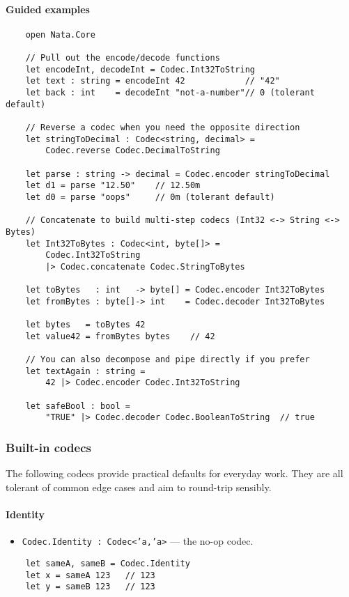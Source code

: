 \documentclass{article}
\begin{document}
\paragraph{Guided examples}
\begin{verbatim}
    open Nata.Core

    // Pull out the encode/decode functions
    let encodeInt, decodeInt = Codec.Int32ToString
    let text : string = encodeInt 42            // "42"
    let back : int    = decodeInt "not-a-number"// 0 (tolerant default)

    // Reverse a codec when you need the opposite direction
    let stringToDecimal : Codec<string, decimal> =
        Codec.reverse Codec.DecimalToString

    let parse : string -> decimal = Codec.encoder stringToDecimal
    let d1 = parse "12.50"    // 12.50m
    let d0 = parse "oops"     // 0m (tolerant default)

    // Concatenate to build multi-step codecs (Int32 <-> String <-> Bytes)
    let Int32ToBytes : Codec<int, byte[]> =
        Codec.Int32ToString
        |> Codec.concatenate Codec.StringToBytes

    let toBytes   : int   -> byte[] = Codec.encoder Int32ToBytes
    let fromBytes : byte[]-> int    = Codec.decoder Int32ToBytes

    let bytes   = toBytes 42
    let value42 = fromBytes bytes    // 42

    // You can also decompose and pipe directly if you prefer
    let textAgain : string =
        42 |> Codec.encoder Codec.Int32ToString

    let safeBool : bool =
        "TRUE" |> Codec.decoder Codec.BooleanToString  // true
\end{verbatim}

\subsubsection{Built-in codecs}
The following codecs provide practical defaults for everyday work. They are all tolerant of common edge cases and aim to round-trip sensibly.

\paragraph{Identity}
\begin{itemize}
  \item \texttt{Codec.Identity : Codec<'a,'a>} — the no-op codec.
\end{itemize}
\begin{verbatim}
    let sameA, sameB = Codec.Identity
    let x = sameA 123   // 123
    let y = sameB 123   // 123
\end{verbatim}
\end{document}
